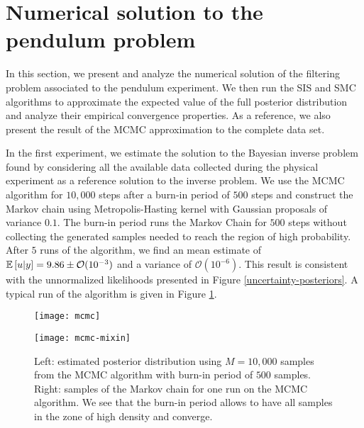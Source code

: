 \section{Numerical solution to the pendulum problem}
In this section, we present and analyze the numerical solution of the filtering problem associated to the pendulum experiment. We then run the SIS and SMC algorithms to approximate the expected value of the full posterior distribution and analyze their empirical convergence properties. As a reference, we also present the result of the MCMC approximation to the complete data set.

In the first experiment, we estimate the solution to the Bayesian inverse problem found by considering all the available data collected during the physical experiment as a reference solution to the inverse problem. We use the MCMC algorithm for $10,000$ steps after a burn-in period of $500$ steps and construct the Markov chain using Metropolis-Hasting kernel with Gaussian proposals of variance $0.1$. The burn-in period runs the Markov Chain for $500$ steps without collecting the generated samples needed to reach the region of high probability. After $5$ runs of the algorithm, we find an mean estimate of $\mathbb{E}\left[u|y\right] = 9.86 \pm \mathcal{O}(10^{-3})$ and a variance of $\mathcal{O}(10^{-6})$. This result is consistent with the unnormalized likelihoods presented in Figure \ref{uncertainty-posteriors}. A typical run of the algorithm is given in Figure \ref{mcmc-figure}.

\begin{figure}[!b]
  \label{mcmc-figure}
  \begin{minipage}{.43\textwidth}
    \texttt{[image: mcmc]}
  \end{minipage}
  \begin{minipage}{.5\textwidth}
    \texttt{[image: mcmc-mixin]}
  \end{minipage}
  \caption{Left: estimated posterior distribution using $M=10,000$ samples from the MCMC algorithm with burn-in period of $500$ samples. Right: samples of the Markov chain for one run on the MCMC algorithm. We see that the burn-in period allows to have all samples in the zone of high density and converge.}
\end{figure}

